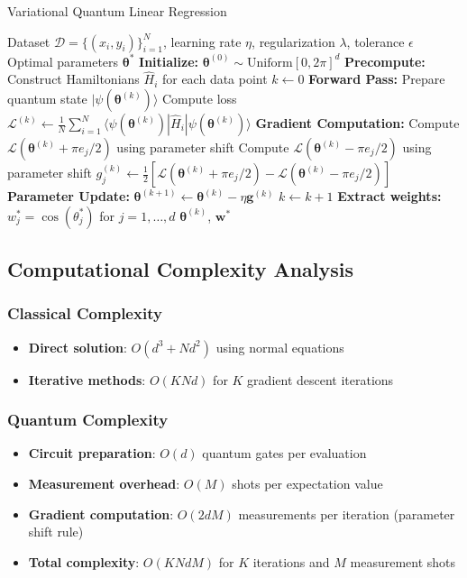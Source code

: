 \documentclass[11pt]{article}
\begin{document}
\begin{algorithm}[H]
\caption{Variational Quantum Linear Regression}
\begin{algorithmic}[1]
\Require Dataset $\mathcal{D} = \{(x_i, y_i)\}_{i=1}^N$, learning rate $\eta$, regularization $\lambda$, tolerance $\epsilon$
\Ensure Optimal parameters $\bm{\theta}^*$
\State \textbf{Initialize:} $\bm{\theta}^{(0)} \sim \text{Uniform}[0, 2\pi]^d$
\State \textbf{Precompute:} Construct Hamiltonians $\hat{H}_i$ for each data point
\State $k \leftarrow 0$
    \State \textbf{Forward Pass:}
    \State \quad Prepare quantum state $|\psi(\bm{\theta}^{(k)})\rangle$
    \State \quad Compute loss $\mathcal{L}^{(k)} \leftarrow \frac{1}{N} \sum_{i=1}^N \langle \psi(\bm{\theta}^{(k)}) | \hat{H}_i | \psi(\bm{\theta}^{(k)}) \rangle$
    \State \textbf{Gradient Computation:}
        \State Compute $\mathcal{L}(\bm{\theta}^{(k)} + \pi e_j/2)$ using parameter shift
        \State Compute $\mathcal{L}(\bm{\theta}^{(k)} - \pi e_j/2)$ using parameter shift
        \State $g_j^{(k)} \leftarrow \frac{1}{2}[\mathcal{L}(\bm{\theta}^{(k)} + \pi e_j/2) - \mathcal{L}(\bm{\theta}^{(k)} - \pi e_j/2)]$
    \EndFor
    \State \textbf{Parameter Update:}
    \State $\bm{\theta}^{(k+1)} \leftarrow \bm{\theta}^{(k)} - \eta \bm{g}^{(k)}$
    \State $k \leftarrow k + 1$
\EndWhile
\State \textbf{Extract weights:} $w_j^* = \cos(\theta_j^*)$ for $j = 1, \ldots, d$
\Return $\bm{\theta}^{(k)}$, $\mathbf{w}^*$
\end{algorithmic}
\end{algorithm}

\subsection{Computational Complexity Analysis}

\subsubsection{Classical Complexity}
\begin{itemize}
\item \textbf{Direct solution}: $O(d^3 + Nd^2)$ using normal equations
\item \textbf{Iterative methods}: $O(KNd)$ for $K$ gradient descent iterations
\end{itemize}

\subsubsection{Quantum Complexity}
\begin{itemize}
\item \textbf{Circuit preparation}: $O(d)$ quantum gates per evaluation
\item \textbf{Measurement overhead}: $O(M)$ shots per expectation value
\item \textbf{Gradient computation}: $O(2dM)$ measurements per iteration (parameter shift rule)
\item \textbf{Total complexity}: $O(KNdM)$ for $K$ iterations and $M$ measurement shots
\end{itemize}
\end{document}

